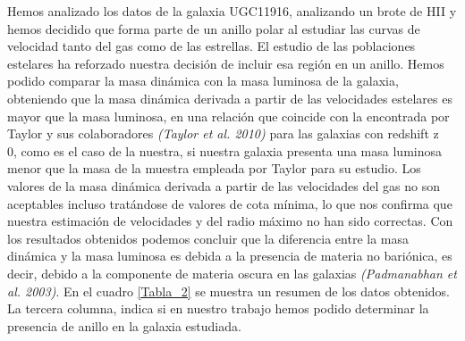 \documentclass{article}
\begin{document}
Hemos analizado los datos de la galaxia UGC11916, analizando un brote de HII y hemos decidido que forma parte de un anillo polar al estudiar las curvas de velocidad tanto del gas como de las estrellas. El estudio de las poblaciones estelares ha reforzado nuestra decisión de incluir esa región en un anillo.
Hemos podido comparar la masa dinámica con la masa luminosa de la galaxia, obteniendo que la masa dinámica derivada a partir de las velocidades estelares es mayor que la masa luminosa, en una relación que coincide con la encontrada por Taylor y sus colaboradores \emph{(Taylor et al. 2010)} para las galaxias con redshift z ~ 0, como es el caso de la nuestra, si nuestra galaxia presenta una masa luminosa menor que la masa de la muestra empleada por Taylor para su estudio. Los valores de la masa dinámica derivada a partir de las velocidades del gas no son aceptables incluso tratándose de valores de cota mínima, lo que nos confirma que nuestra estimación de velocidades y del radio máximo no han sido correctas. Con los resultados obtenidos podemos concluir que la diferencia entre la masa dinámica y la masa luminosa es debida a la presencia de materia no bariónica, es decir, debido a la componente de materia oscura en las galaxias \emph{(Padmanabhan et al. 2003)}. En el cuadro \ref{Tabla_2} se muestra un resumen de los datos obtenidos. La tercera columna, indica si en nuestro trabajo hemos podido determinar la presencia de anillo en la galaxia estudiada.

\begin{table}[H]
\centering
{}
\caption{Valores obtenidos para la galaxia UGC11916}
\label{Tabla_2}
\end{table}




\end{document}
